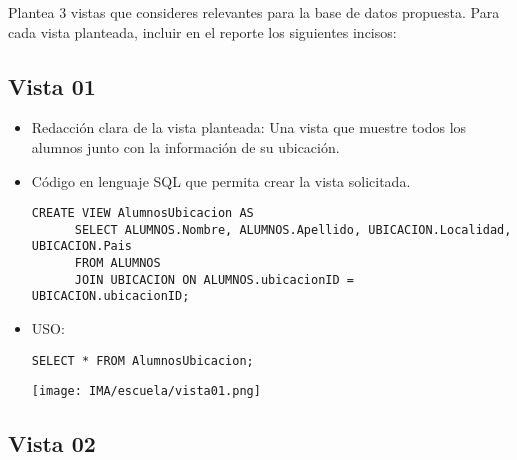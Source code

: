 Plantea 3 vistas que consideres relevantes para la base de datos propuesta. Para cada vista planteada, incluir en el reporte los siguientes incisos:

\subsection*{Vista 01}
\begin{itemize}
    \item Redacción clara de la vista planteada: Una vista que muestre todos los alumnos junto con la información de su ubicación.
    \item Código en lenguaje SQL que permita crear la vista solicitada.
    
    \begin{lstlisting}[caption={Tablas para la BdDatos}, label={lst:sql_estadios}]
      CREATE VIEW AlumnosUbicacion AS
      SELECT ALUMNOS.Nombre, ALUMNOS.Apellido, UBICACION.Localidad, UBICACION.Pais
      FROM ALUMNOS
      JOIN UBICACION ON ALUMNOS.ubicacionID = UBICACION.ubicacionID;
    \end{lstlisting}    
    
    \item USO:
    
    \begin{lstlisting}[caption={Tablas para la BdDatos}, label={lst:sql_estadios}]
      SELECT * FROM AlumnosUbicacion;
    \end{lstlisting}    

    \begin{center}
      \texttt{[image: IMA/escuela/vista01.png]}
    \end{center}
\end{itemize}


\subsection*{Vista 02}

